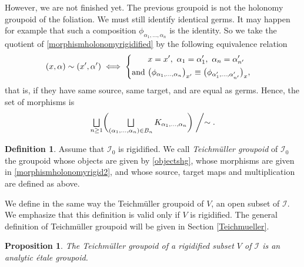 \documentclass[10pt]{amsart}
\let\mathcal\mathscr
\let\oldbigsqcup\bigsqcup
\renewcommand{\bigsqcup}{\mathop{\textstyle\oldbigsqcup}\displaylimits}
\theoremstyle{plain}
\newtheorem{proposition}[theorem]{Proposition}
\theoremstyle{definition}
\newtheorem{definition}[theorem]{Definition}
\theoremstyle{remark}
\numberwithin{equation}{section}
\newcommand{\cI}{\mathcal{I}}
\let\uniondisjointe\bigsqcup
\begin{document}
However, we are not finished yet. The previous groupoid is not the holonomy groupoid of the foliation. We must still identify identical germs. It may happen for example that such a composition $\phi_{\alpha_1,\hdots,\alpha_n}$ is the identity. So we take the quotient of \eqref{morphismholonomyrigidified} by the following equivalence relation
\begin{equation}
\label{equivrigid}
(x,\alpha)\sim (x',\alpha')\iff
\left\{
\begin{aligned}
&x=x',\ \alpha_1=\alpha'_1,\ \alpha_n=\alpha'_{n'}\cr
\text{and }&\big (\phi_{\alpha_1,\hdots,\alpha_n}\big )_{x'}\equiv \big (\phi_{\alpha'_1,\hdots,\alpha'_{n'}}\big )_x,
\end{aligned}
\right .
\end{equation}
that is, if they have same source, same target, and are equal as germs.
Hence, the set of morphisms is
\begin{equation}
\label{morphismholonomyrigid2}
\uniondisjointe_{n\geq 1}\biggl (\uniondisjointe_{(\alpha_1,\hdots,\alpha_n) \in B_{n}} K_{\alpha_1,\hdots,\alpha_n}\biggr )\biggm /\sim.
\end{equation}

\begin{definition}
\label{teichrigid}
Assume that $\cI_0$ is rigidified. We call \emph{Teichmüller groupoid} of $\cI_0$ the groupoid whose objects are given by \eqref{objectshg}, whose morphisms are given in \eqref{morphismholonomyrigid2}, and whose source, target maps and multiplication are defined as above.
\end{definition}
We define in the same way the Teichmüller groupoid of $V$, an open subset of $\cI$. We emphasize that this definition is valid only if $V$ is rigidified. The general definition of Teichmüller groupoid will be given in Section \ref{Teichmueller}.

\begin{proposition}
\label{groupoidrigid}
The Teichmüller groupoid of a rigidified subset $V$ of $\cI$ is an analytic étale groupoid.
\end{proposition}
\end{document}
